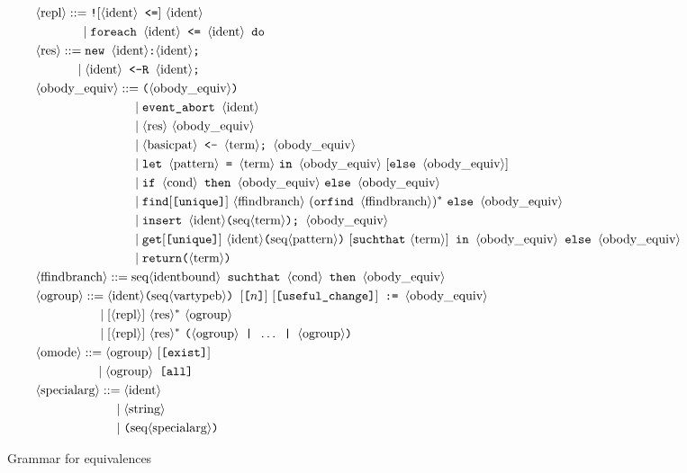 \begin{figure}
\def\phf{\phantom{\fungroup = }\mid}
\def\phfm{\phantom{\funmode = }\mid}
\def\phfb{\phantom{\funbody = }\mid}
\def\phsa{\phantom{\nonterm{specialarg} = }\mid}
\begin{align*}
&\nonterm{repl} ::= \texttt{!} [\nonterm{ident}\texttt{ <=}]\ \nonterm{ident}\\
&\phantom{\nonterm{repl} =}\mid \texttt{foreach } \nonterm{ident}\texttt{ <= }\nonterm{ident}\texttt{ do }\\
%
&\nonterm{res} ::= \Resavt\texttt{;}\\
&\phantom{\nonterm{res} =}\mid \Resbvt\texttt{;}\\
%
&\funbody ::= \texttt{(} \funbody \texttt{)}\\
&\phfb \texttt{event\string_abort }\nonterm{ident}\\
&\phfb \nonterm{res}\ \funbody\\
&\phfb \nonterm{basicpat} \texttt{ <- }\nonterm{term}\texttt{; }\funbody\\
&\phfb \texttt{let }\nonterm{pattern} \texttt{ = }\nonterm{term}\ 
\texttt{in }\funbody\ [\texttt{else }\funbody]\\
&\phfb \texttt{if }\nonterm{cond}\texttt{ then }\funbody\ \texttt{else }\funbody\\
&\phfb \texttt{find}[\texttt{[unique]}]\ \nonterm{ffindbranch}\ (\texttt{orfind }\nonterm{ffindbranch})^* \ \texttt{else }\funbody\\
&\phfb \texttt{insert }\nonterm{ident}\texttt{(}\seq{term}\texttt{)}\texttt{; }\funbody\\
&\phfb \texttt{get}[\texttt{[unique]}]\ \nonterm{ident}\texttt{(}\seq{pattern}\texttt{)}\ [\texttt{suchthat}\ \nonterm{term}]\texttt{ in }\funbody\texttt{ else }\funbody\\
&\phfb \texttt{return(}\nonterm{term}\texttt{)}\\
&\nonterm{ffindbranch} ::= \seq{identbound} \texttt{ suchthat }\nonterm{cond}\texttt{ then }\funbody\\
%
&\fungroup ::= \nonterm{ident}\texttt{(}\seq{vartypeb}\texttt{) }[\texttt{[}n\texttt{]}]\ [\texttt{[useful\_change]}]\texttt{ := }\funbody\\
&\phf [\nonterm{repl}]\ \nonterm{res}^*\ 
\fungroup\\
&\phf [\nonterm{repl}]\ \nonterm{res}^*\ 
\texttt{(}\fungroup \texttt{ | }\ldots\texttt{ | }\fungroup\texttt{)}\\
&\funmode ::= \fungroup\ [\texttt{[exist]}]\\
&\phfm \fungroup \texttt{ [all]}\\
&\nonterm{specialarg} ::= \nonterm{ident}\\
&\phsa \nonterm{string}\\
&\phsa \texttt{(} \seq{specialarg} \texttt{)}
\end{align*}
\caption{Grammar for equivalences}
\label{fig:syntax3}
\end{figure}


